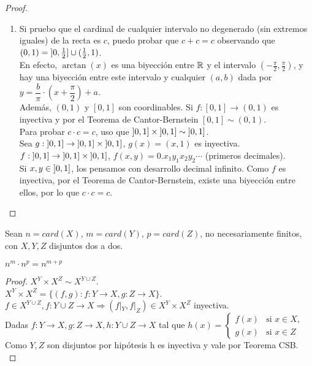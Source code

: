 \begin{eg}
\begin{proof}
\begin{enumerate}
      \item Si pruebo que el cardinal de cualquier intervalo no degenerado (sin extremos iguales) de la recta es \(c\), puedo probar que \(c+c=c\) observando que \((0,1) = \interval[open left]{0}{\frac{1}{2}} \cup (\frac{1}{2}, 1)\). \\
            En efecto, \(\arctan(x)\) es una biyección entre \(\mathbb{R} \) y el intervalo \((-\frac{\pi}{2}, \frac{\pi}{2})\), y hay una biyección entre este intervalo y cualquier \((a, b)\) dada por \(y = \dfrac{b}{\pi} \cdot (x + \dfrac{\pi}{2}) + a\). \\
            Además, \((0, 1)\) y \([0, 1]\) son coordinables. Si \(f: [0, 1] \to (0, 1)\) es inyectiva y por el Teorema de Cantor-Bernstein \([0, 1] \sim (0, 1)\). \\
            Para probar \(c \cdot c = c\), uso que \(\interval[open left]{0}{1} \times \interval[open left]{0}{1} \sim \interval[open left]{0}{1} \). \\
            Sea \(g: \interval[open left]{0}{1} \to \interval[open left]{0}{1} \times \interval[open left]{0}{1} \), \(g(x) = (x, 1)\) es inyectiva. \\
            \(f: \interval[open left]{0}{1} \to \interval[open left]{0}{1} \times \interval[open left]{0}{1} \), \(f(x, y) = 0.x_1y_1x_2y_2\cdots \) (primeros decimales). \\
            Si \(x, y \in \interval[open left]{0}{1} \), los pensamos con desarrollo decimal infinito. Como \(f\) es inyectiva, por el Teorema de Cantor-Bernstein, existe una biyección entre ellos, por lo que \(c \cdot c = c\).
    \end{enumerate}
  \end{proof}
\end{eg}

Sean \(n = card(X)\), \(m = card(Y)\), \(p = card(Z)\), no necesariamente finitos, con \(X, Y, Z\) disjuntos dos a dos.

\begin{prop}
  \(n^m \cdot n^p = n^{m+p} \) \\
  \begin{proof}
    \(X^Y \times X^Z \sim X^{Y \cup Z} \). \\
    \(X^Y \times X^Z = \{ (f, g) : f: Y \to X, g: Z \to X \} \). \\
    \(f \in X^{Y \cup Z}, f: Y \cup Z \to X \Rightarrow (f|_Y, f|_Z) \in X^Y \times X^Z\) inyectiva. \\
    Dadas \(f: Y \to X, g: Z \to X, h: Y \cup Z \to X\) tal que \(h(x) = \begin{cases}
      f(x) & \text{si } x \in X, \\
      g(x) & \text{si } x \in Z
    \end{cases} \) \\
    Como \(Y, Z\) son disjuntos por hipótesis h es inyectiva y vale por Teorema CSB. \\
  \end{proof}
\end{prop}

